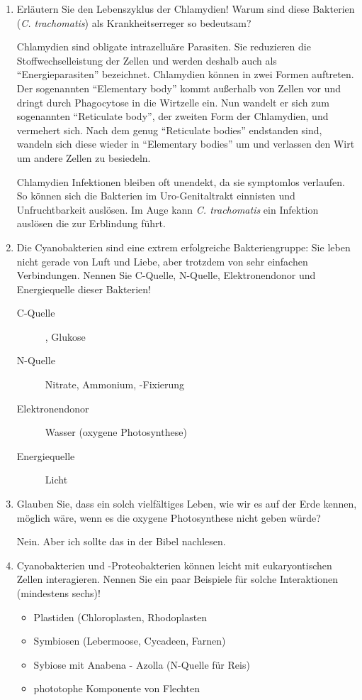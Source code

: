 \begin{enumerate}
	\item Erläutern Sie den Lebenszyklus der Chlamydien! Warum sind diese Bakterien (\emph{C. trachomatis}) als Krankheitserreger so bedeutsam?
		
		Chlamydien sind obligate intrazelluäre Parasiten.
		Sie reduzieren die Stoffwechselleistung der Zellen und werden deshalb auch als ``Energieparasiten'' bezeichnet.
		Chlamydien können in zwei Formen auftreten.
		Der sogenannten ``Elementary body'' kommt außerhalb von Zellen vor und dringt
		durch Phagocytose in die Wirtzelle ein.
		Nun wandelt er sich zum sogenannten ``Reticulate body'',
		der zweiten Form der Chlamydien,
		und vermehert sich.
		Nach dem genug ``Reticulate bodies'' endstanden sind,
		wandeln sich diese wieder in ``Elementary bodies'' um und verlassen den Wirt um andere Zellen zu besiedeln.

		Chlamydien Infektionen bleiben oft unendekt,
		da sie symptomlos verlaufen.
		So können sich die Bakterien im Uro-Genitaltrakt einnisten
		und Unfruchtbarkeit auslösen.
		Im Auge kann \emph{C. trachomatis} ein Infektion auslösen die zur Erblindung führt.

	\item Die Cyanobakterien sind eine extrem erfolgreiche Bakteriengruppe: Sie leben nicht gerade von Luft und Liebe, aber trotzdem von sehr einfachen Verbindungen. Nennen Sie C-Quelle, N-Quelle, Elektronendonor und Energiequelle dieser Bakterien!
		\begin{description}
			\item[C-Quelle]	, Glukose
			\item[N-Quelle]	Nitrate, Ammonium, -Fixierung
			\item[Elektronendonor] 	Wasser (oxygene Photosynthese)
			\item[Energiequelle]		Licht
		\end{description}

	\item Glauben Sie, dass ein solch vielfältiges Leben, wie wir es auf der Erde kennen, möglich wäre, wenn es die oxygene Photosynthese nicht geben würde?

		Nein. Aber ich sollte das in der Bibel nachlesen.

	\item Cyanobakterien und -Proteobakterien können leicht mit eukaryontischen Zellen interagieren. Nennen Sie ein paar Beispiele für solche Interaktionen (mindestens sechs)!
	
		\begin{itemize}
			\item Plastiden \hfill (Chloroplasten, Rhodoplasten
			\item Symbiosen \hfill (Lebermoose, Cycadeen, Farnen)
			\item Sybiose mit Anabena - Azolla \hfill (N-Quelle für Reis)
			\item phototophe Komponente von Flechten
		\end{itemize}


\end{enumerate}
